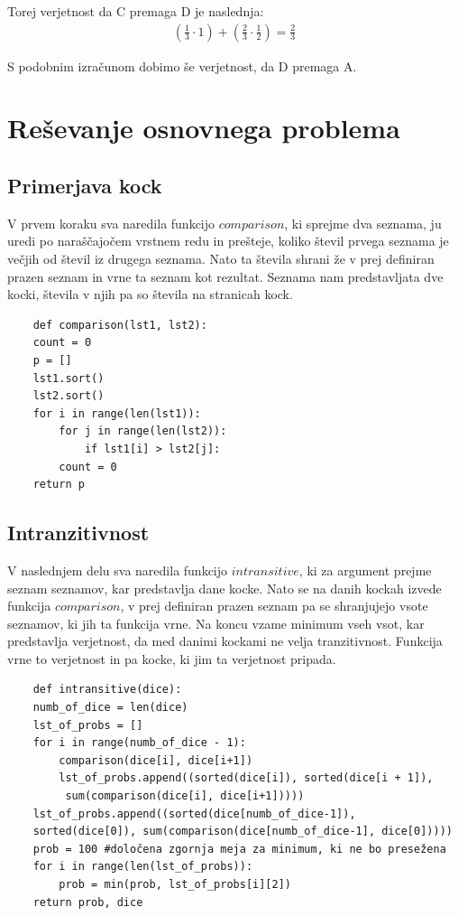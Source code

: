 \documentclass[12pt,a4paper]{amsart}
\begin{document}
Torej verjetnost da C premaga D je naslednja:
\begin{align*}
    (\frac{1}{3}\cdot 1)+(\frac{2}{3}\cdot\frac{1}{2}) = \frac{2}{3}
\end{align*}

S podobnim izračunom dobimo še verjetnost, da D premaga A.


\section{Reševanje osnovnega problema}
\subsection{Primerjava kock}
V prvem koraku sva naredila funkcijo $comparison$, ki \linebreak
sprejme dva seznama, ju uredi po naraščajočem vrstnem redu in prešteje, koliko števil prvega seznama je večjih od števil iz drugega seznama. Nato ta števila shrani že 
v prej definiran prazen seznam in vrne ta seznam kot rezultat.
Seznama nam predstavljata dve kocki, števila v njih pa so števila na stranicah kock.
 \begin{verbatim}
    def comparison(lst1, lst2):
    count = 0
    p = []
    lst1.sort()
    lst2.sort()
    for i in range(len(lst1)):
        for j in range(len(lst2)):
            if lst1[i] > lst2[j]:
        count = 0 
    return p
 \end{verbatim}
 \subsection{Intranzitivnost}
 V naslednjem delu sva naredila funkcijo $intransitive$, ki za argument prejme seznam seznamov, kar predstavlja dane kocke.
 Nato se na danih kockah izvede funkcija $comparison$, v prej definiran prazen seznam pa se shranjujejo vsote seznamov, ki jih ta funkcija vrne.
 Na koncu vzame minimum vseh vsot, kar predstavlja verjetnost, da med danimi kockami ne velja tranzitivnost. Funkcija vrne to verjetnost in pa kocke, ki jim ta verjetnost pripada.
 \begin{verbatim}
    def intransitive(dice):
    numb_of_dice = len(dice)
    lst_of_probs = []
    for i in range(numb_of_dice - 1):
        comparison(dice[i], dice[i+1])
        lst_of_probs.append((sorted(dice[i]), sorted(dice[i + 1]),
         sum(comparison(dice[i], dice[i+1]))))
    lst_of_probs.append((sorted(dice[numb_of_dice-1]), 
    sorted(dice[0]), sum(comparison(dice[numb_of_dice-1], dice[0]))))
    prob = 100 #določena zgornja meja za minimum, ki ne bo presežena
    for i in range(len(lst_of_probs)): 
        prob = min(prob, lst_of_probs[i][2])
    return prob, dice
 \end{verbatim}
\end{document}
